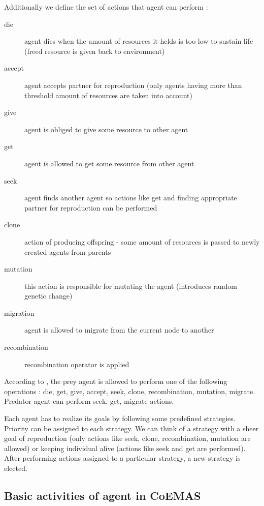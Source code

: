 Additionally we define the set of actions that agent can perform :

\begin{description}
  \item [die]
      agent dies when the amount of resources it helds is too low to sustain life (freed resource is given back to environment)
  \item [accept]
      agent accepts partner for reproduction (only agents having more than threshold amount of resources are taken into account)
  \item [give]
      agent is obliged to give some resource to other agent
  \item [get]
      agent is allowed to get some resource from other agent
  \item [seek]
      agent finds another agent so actions like get and finding appropriate partner for reproduction can be performed
  \item [clone]
      action of producing offspring - some amount of resources is passed to newly created agents from parents
  \item [mutation]
      this action is responsible for mutating the agent (introduces random genetic change)
  \item [migration]
      agent is allowed to migrate from the current node to another
  \item [recombination]
      recombination operator is applied

\end{description}


According to \cite{Dre}, the prey agent is allowed to perform one of the following operations : die, get, give, accept, seek, clone, recombination, mutation,
 migrate. Predator agent can perform seek, get, migrate actions.

Each agent has to realize its goals by following some predefined strategies.
Priority can be assigned to each strategy.
We can think of a strategy with a sheer goal of reproduction (only actions like seek, clone, recombination, mutation are allowed) or keeping individual alive
(actions like seek and get are performed).
After performing actions assigned to a particular strategy, a new strategy is elected. 

\subsection{Basic activities of agent in CoEMAS}


